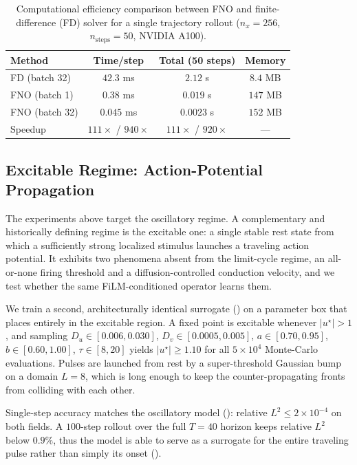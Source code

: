 \documentclass[runningheads]{llncs}
\begin{document}
\begin{table}[!ht]
\centering
\begin{small}
\setlength{\tabcolsep}{4pt}
\begin{tabular}{lccc}
\toprule
Method & Time/step & Total (50 steps) & Memory \\
\midrule
FD (batch 32) & $42.3$ ms & $2.12$ s & $8.4$ MB \\
FNO (batch 1) & $0.38$ ms & $0.019$ s & $147$ MB \\
FNO (batch 32) & $0.045$ ms & $0.0023$ s & $152$ MB \\
\midrule
Speedup & $111\times$ / $940\times$ & $111\times$ / $920\times$ & --- \\
\bottomrule
\end{tabular}
\end{small}
\smallskip
\caption{Computational efficiency comparison between FNO and finite-difference (FD) solver for a single trajectory rollout ($n_x = 256$, $n_{\text{steps}} = 50$, NVIDIA A100).}
\label{tab:efficiency_comparison}
\end{table}

\subsection{Excitable Regime: Action-Potential Propagation}
\label{sec:excitable_results}

The experiments above target the oscillatory regime. A complementary and historically defining regime is the excitable one: a single stable rest state from which a sufficiently strong localized stimulus launches a traveling action potential. It exhibits two phenomena absent from the limit-cycle regime, an all-or-none firing threshold and a diffusion-controlled conduction velocity, and we test whether the same FiLM-conditioned operator learns them.

We train a second, architecturally identical surrogate () on a parameter box that  places entirely in the excitable region. A fixed point is excitable whenever $|u^\star| > 1$, and sampling $D_u \in [0.006, 0.030]$, $D_v \in [0.0005, 0.005]$, $a \in [0.70, 0.95]$, $b \in [0.60, 1.00]$, $\tau \in [8, 20]$ yields $|u^\star| \ge 1.10$ for all $5{\times}10^4$ Monte-Carlo evaluations. Pulses are launched from rest by a super-threshold Gaussian bump on a domain $L = 8$, which is long enough to keep the counter-propagating fronts from colliding with each other.

Single-step accuracy matches the oscillatory model (): relative $L^2 \le 2 \times 10^{-4}$ on both fields. A $100$-step rollout over the full $T = 40$ horizon keeps relative $L^2$ below $0.9\%$, thus the model is able to serve as a surrogate for the entire traveling pulse rather than simply its onset ().
\end{document}
